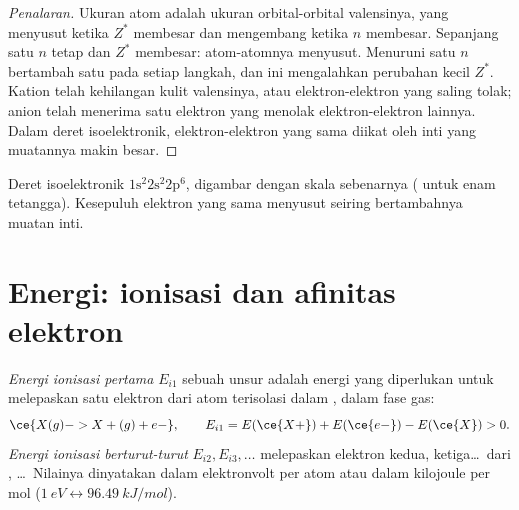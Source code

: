 \begin{proof}[Penalaran]
Ukuran atom adalah ukuran orbital-orbital valensinya, yang menyusut
ketika $Z^{*}$ membesar dan mengembang ketika $n$ membesar. Sepanjang
satu  $n$ tetap dan $Z^{*}$ membesar: atom-atomnya menyusut.
Menuruni satu  $n$ bertambah satu pada setiap langkah, dan ini
mengalahkan perubahan kecil $Z^{*}$. Kation telah kehilangan kulit
valensinya, atau elektron-elektron yang saling tolak; anion telah
menerima satu elektron yang menolak elektron-elektron lainnya. Dalam
deret isoelektronik, elektron-elektron yang sama diikat oleh inti yang
muatannya makin besar.
\end{proof}

\begin{omfigure}

{\small Deret isoelektronik $1\text{s}^2 2\text{s}^2 2\text{p}^6$,
digambar dengan skala sebenarnya ( untuk enam tetangga).
Kesepuluh elektron yang sama menyusut seiring bertambahnya muatan inti.}
\end{omfigure}

\section{Energi: ionisasi dan afinitas elektron}

\begin{definition}\label{def:b1:periodicity:ionisation-energy}
\emph{Energi ionisasi pertama} $E_{i1}$
sebuah unsur adalah energi yang diperlukan untuk melepaskan satu elektron
dari atom terisolasi dalam , dalam fase gas:
\[
  \ce{X(g) -> X+(g) + e-}, \qquad E_{i1} = E(\ce{X+}) + E(\ce{e-}) - E(\ce{X}) > 0 .
\]
\emph{Energi ionisasi berturut-turut}
$E_{i2}, E_{i3}, \dots$ melepaskan elektron kedua, ketiga\dots\ dari
, \dots\ Nilainya dinyatakan dalam elektronvolt per
atom atau dalam kilojoule per mol
($\qty{1}{eV} \leftrightarrow \qty{96.49}{kJ/mol}$).
\end{definition}

